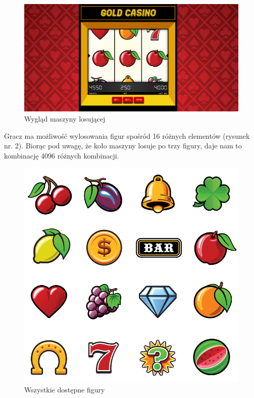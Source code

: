 \documentclass[a4paper,11pt,titlepage]{article}
\begin{document}
\begin{figure}[H]
\centering
\includegraphics[width=1\columnwidth]{img/screen.PNG}
\caption{Wygląd maszyny losującej} 
\end{figure}

Gracz ma możliwość wylosowania figur spośród 16 różnych elementów (rysunek nr. 2). Biorąc pod uwagę, że koło maszyny losuje po trzy figury, daje nam to kombinację 4096 różnych kombinacji.

\begin{figure}[H]
\centering
\includegraphics[width=1\columnwidth]{img/ikony.PNG}
\caption{Wszystkie dostępne figury} 
\end{figure}
\end{document}
